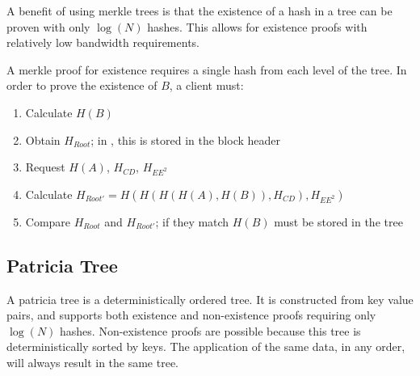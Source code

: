 \begin{figure}
\end{figure}

A benefit of using merkle trees is that the existence of a hash in a tree can be proven with only $\log(N)$ hashes.
This allows for existence proofs with relatively low bandwidth requirements.

A merkle proof for existence requires a single hash from each level of the tree.
In order to prove the existence of $B$, a client must:
\begin{enumerate}
	\item{Calculate $H(B)$}
	\item{Obtain $H_{Root}$; in \codename, this is stored in the block header}
	\item{Request $H(A)$, $H_{CD}$, $H_{EE^2}$}
	\item{Calculate $H_{Root'} = H(H(H(H(A), H(B)), H_{CD}), H_{EE^2})$}
	\item{Compare $H_{Root}$ and $H_{Root'}$; if they match $H(B)$ must be stored in the tree}
\end{enumerate}

\subsection{Patricia Tree}
\label{sec:trees:patricia}

A patricia tree\cite{Morrison1968} is a deterministically ordered tree.
It is constructed from key value pairs, and supports both existence and non-existence proofs requiring only $\log(N)$ hashes.
Non-existence proofs are possible because this tree is deterministically sorted by keys.
The application of the same data, in any order, will always result in the same tree.


